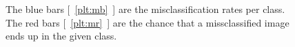 \begin{figure}[h!t]
\newcommand{\plotref}[1]{{[~\ref{plt:#1}~]}}
\centering
\caption{The  blue bars \plotref{mb} are the misclassification rates per class. The red bars \plotref{mr} are the chance that a missclassified image ends up in the given class.  } %
\label{figparam}

\end{figure}







